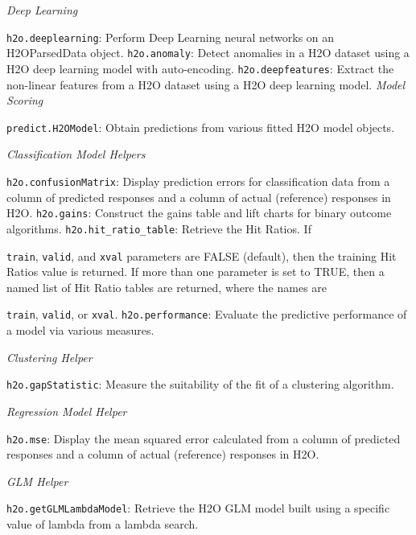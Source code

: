 {\emph{Deep Learning}\par
{\texttt{h2o.deeplearning}}: Perform Deep Learning neural networks on an H2OParsedData object.\newline
{\texttt{h2o.anomaly}}: Detect anomalies in a H2O dataset using a H2O deep learning model with auto-encoding.\newline
{\texttt{h2o.deepfeatures}}: Extract the non-linear features from a H2O dataset using a H2O deep learning model.\newline
\newpage
\emph{Model Scoring}\par
{\texttt{predict.H2OModel}}: Obtain predictions from various fitted H2O model objects.\newline

\emph{Classification Model Helpers}\par
{\texttt{h2o.confusionMatrix}}: Display prediction errors for classification data from a column of predicted responses and a column of actual (reference) responses in H2O.\newline
{\texttt{h2o.gains}}: Construct the gains table and lift charts for binary outcome algorithms.\newline%
{\texttt{h2o.hit\_ratio\_table}}: Retrieve the Hit Ratios. If {\texttt{train}, {\texttt{valid}}, and {\texttt{xval}} parameters are FALSE (default), then the training Hit Ratios value is returned. If more than one parameter is set to TRUE, then a named list
of Hit Ratio tables are returned, where the names are {\texttt{train}, {\texttt{valid}}, or {\texttt{xval}}.\newline
{\texttt{h2o.performance}}: Evaluate the predictive performance of a model via various measures.\newline

{\emph{Clustering Helper}}\par
{\texttt{h2o.gapStatistic}}: Measure the suitability of the fit of a clustering algorithm. \newline%

\emph{Regression Model Helper}\par
{\texttt{h2o.mse}}: Display the mean squared error calculated from a column of predicted responses and a column of actual (reference) responses in H2O.\newline

\emph{GLM Helper}\par
{\texttt{h2o.getGLMLambdaModel}}: Retrieve the H2O GLM model built using a specific value of lambda from a lambda search.\newline%

}}}
